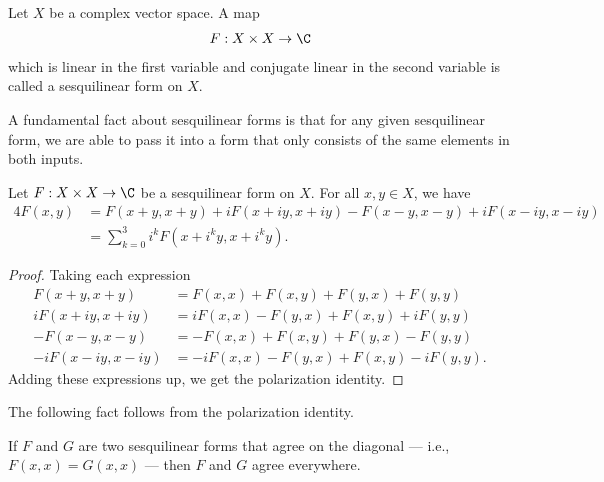 \documentclass[10pt]{mypackage}
\begin{document}
\begin{definition}
  Let $X$ be a complex vector space. A map
  \begin{align*}
    F: X\times X \rightarrow \C
  \end{align*}
  which is linear in the first variable and conjugate linear in the second variable is called a sesquilinear form on $X$.
\end{definition}
A fundamental fact about sesquilinear forms is that for any given sesquilinear form, we are able to pass it into a form that only consists of the same elements in both inputs.
\begin{lemma}
Let $F: X\times X \rightarrow \C$ be a sesquilinear form on $X$. For all $x,y\in X$, we have
\begin{align*}
  4 F\left(x,y\right) &=  F\left(x+y,x+y\right) + iF\left(x+iy,x+iy\right) - F\left(x-y,x-y\right) + iF\left(x-iy,x-iy\right)\\
                      &= \sum_{k=0}^{3}i^{k}F\left(x + i^{k}y,x + i^{k}y\right).
\end{align*}
\end{lemma}
\begin{proof}
  Taking each expression
  \begin{align*}
    F\left(x+y,x+y\right) &= F\left(x,x\right) + F\left(x,y\right) + F\left(y,x\right) + F\left(y,y\right)\\
    iF\left(x + iy,x + iy\right) &= iF\left(x,x\right) - F\left(y,x\right) + F\left(x,y\right) + iF\left(y,y\right)\\
    -F\left(x-y,x-y\right) &= -F\left(x,x\right) + F\left(x,y\right) + F\left(y,x\right) - F\left(y,y\right)\\
    -iF\left(x-iy,x-iy\right) &= -iF\left(x,x\right) -F\left(y,x\right) + F\left(x,y\right) - iF\left(y,y\right).
  \end{align*}
  Adding these expressions up, we get the polarization identity.
\end{proof}
The following fact follows from the polarization identity.
\begin{fact}
  If $F$ and $G$ are two sesquilinear forms that agree on the diagonal --- i.e., $F(x,x) = G(x,x)$ --- then $F$ and $G$ agree everywhere.
\end{fact}
\end{document}
